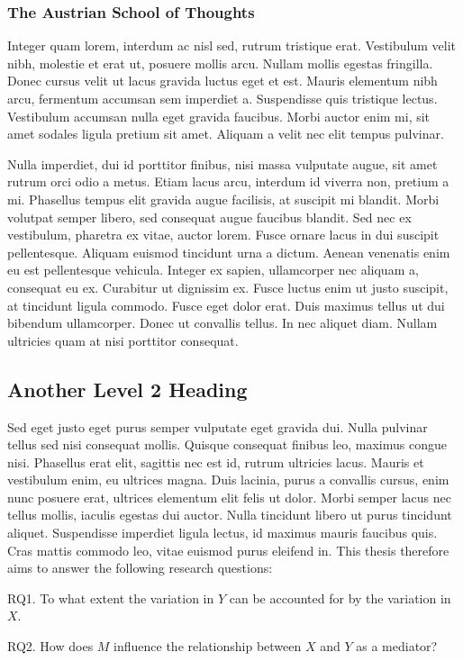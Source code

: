 \subsubsection{The Austrian School of Thoughts}

Integer quam lorem, interdum ac nisl sed, rutrum tristique erat. Vestibulum velit nibh, molestie et erat ut, posuere mollis arcu. Nullam mollis egestas fringilla. Donec cursus velit ut lacus gravida luctus eget et est. Mauris elementum nibh arcu, fermentum accumsan sem imperdiet a. Suspendisse quis tristique lectus. Vestibulum accumsan nulla eget gravida faucibus. Morbi auctor enim mi, sit amet sodales ligula pretium sit amet. Aliquam a velit nec elit tempus pulvinar.

Nulla imperdiet, dui id porttitor finibus, nisi massa vulputate augue, sit amet rutrum orci odio a metus. Etiam lacus arcu, interdum id viverra non, pretium a mi. Phasellus tempus elit gravida augue facilisis, at suscipit mi blandit. Morbi volutpat semper libero, sed consequat augue faucibus blandit. Sed nec ex vestibulum, pharetra ex vitae, auctor lorem. Fusce ornare lacus in dui suscipit pellentesque. Aliquam euismod tincidunt urna a dictum. Aenean venenatis enim eu est pellentesque vehicula. Integer ex sapien, ullamcorper nec aliquam a, consequat eu ex. Curabitur ut dignissim ex. Fusce luctus enim ut justo suscipit, at tincidunt ligula commodo. Fusce eget dolor erat. Duis maximus tellus ut dui bibendum ullamcorper. Donec ut convallis tellus. In nec aliquet diam. Nullam ultricies quam at nisi porttitor consequat.

\subsection{Another Level 2 Heading}

Sed eget justo eget purus semper vulputate eget gravida dui. Nulla pulvinar tellus sed nisi consequat mollis. Quisque consequat finibus leo, maximus congue nisi. Phasellus erat elit, sagittis nec est id, rutrum ultricies lacus. Mauris et vestibulum enim, eu ultrices magna. Duis lacinia, purus a convallis cursus, enim nunc posuere erat, ultrices elementum elit felis ut dolor. Morbi semper lacus nec tellus mollis, iaculis egestas dui auctor. Nulla tincidunt libero ut purus tincidunt aliquet. Suspendisse imperdiet ligula lectus, id maximus mauris faucibus quis. Cras mattis commodo leo, vitae euismod purus eleifend in. This thesis therefore aims to answer the following research questions:
\begin{MAEitemize}
    \item[RQ1.] To what extent the variation in $Y$ can be accounted for by the variation in $X$.
    \item[RQ2.] How does $M$ influence the relationship between $X$ and $Y$ as a mediator?
\end{MAEitemize}

